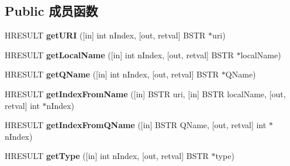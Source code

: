 \subsection*{Public 成员函数}
\begin{DoxyCompactItemize}
\item 
\mbox{\label{interface_m_s_x_m_l2_1_1_i_v_b_s_a_x_attributes_a32838b56e0368596f816f4c2cfbaa8dd}} 
H\+R\+E\+S\+U\+LT {\bfseries get\+U\+RI} (\mbox{[}in\mbox{]} int n\+Index, \mbox{[}out, retval\mbox{]} B\+S\+TR $\ast$uri)
\item 
\mbox{\label{interface_m_s_x_m_l2_1_1_i_v_b_s_a_x_attributes_a47c76aac29b5ec0dfe0ec9c0a2dd35c8}} 
H\+R\+E\+S\+U\+LT {\bfseries get\+Local\+Name} (\mbox{[}in\mbox{]} int n\+Index, \mbox{[}out, retval\mbox{]} B\+S\+TR $\ast$local\+Name)
\item 
\mbox{\label{interface_m_s_x_m_l2_1_1_i_v_b_s_a_x_attributes_a3ceb46d592ed3e6ab8c209bfff90b08b}} 
H\+R\+E\+S\+U\+LT {\bfseries get\+Q\+Name} (\mbox{[}in\mbox{]} int n\+Index, \mbox{[}out, retval\mbox{]} B\+S\+TR $\ast$Q\+Name)
\item 
\mbox{\label{interface_m_s_x_m_l2_1_1_i_v_b_s_a_x_attributes_abcb7a54c72c73fd2cb65f8293b16796e}} 
H\+R\+E\+S\+U\+LT {\bfseries get\+Index\+From\+Name} (\mbox{[}in\mbox{]} B\+S\+TR uri, \mbox{[}in\mbox{]} B\+S\+TR local\+Name, \mbox{[}out, retval\mbox{]} int $\ast$n\+Index)
\item 
\mbox{\label{interface_m_s_x_m_l2_1_1_i_v_b_s_a_x_attributes_a5030eea26c73f90737afb63cd8a9d065}} 
H\+R\+E\+S\+U\+LT {\bfseries get\+Index\+From\+Q\+Name} (\mbox{[}in\mbox{]} B\+S\+TR Q\+Name, \mbox{[}out, retval\mbox{]} int $\ast$n\+Index)
\item 
\mbox{\label{interface_m_s_x_m_l2_1_1_i_v_b_s_a_x_attributes_a663ceda14498d9e8e26be3ebdd4a07dd}} 
H\+R\+E\+S\+U\+LT {\bfseries get\+Type} (\mbox{[}in\mbox{]} int n\+Index, \mbox{[}out, retval\mbox{]} B\+S\+TR $\ast$type)
\item 
\mbox{\label{interface_m_s_x_m_l2_1_1_i_v_b_s_a_x_attributes_a55b69be2554afee12c5fc0f046399478}} 

\end{DoxyCompactItemize}
